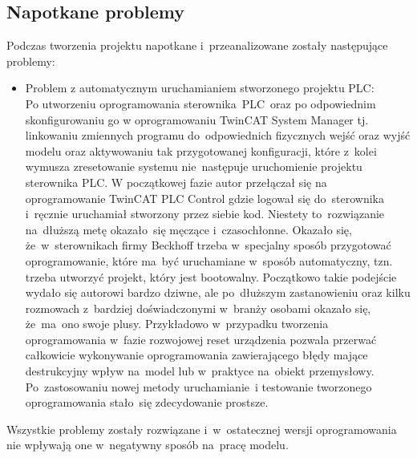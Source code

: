 \subsection{Napotkane problemy}
Podczas tworzenia projektu napotkane i~przeanalizowane zostały następujące problemy:
\begin{itemize}
\item Problem z automatycznym uruchamianiem stworzonego projektu PLC:\\[1mm]
Po utworzeniu oprogramowania sterownika~PLC~oraz po odpowiednim skonfigurowaniu go w oprogramowaniu TwinCAT System Manager tj. linkowaniu zmiennych programu do~odpowiednich fizycznych wejść oraz wyjść modelu oraz aktywowaniu tak przygotowanej konfiguracji, które z~kolei wymusza zresetowanie systemu nie~następuje uruchomienie projektu sterownika PLC. W początkowej fazie autor przełączał się na oprogramowanie TwinCAT PLC Control gdzie logował się do~sterownika i~ręcznie uruchamiał stworzony przez siebie kod. Niestety to~rozwiązanie na~dłuższą metę okazało~się męczące i~czasochłonne. Okazało się, że~w~sterownikach firmy Beckhoff trzeba w~specjalny sposób przygotować oprogramowanie, które ma~być uruchamiane w~sposób automatyczny, tzn. trzeba utworzyć projekt, który jest bootowalny. Początkowo takie podejście wydało się autorowi bardzo dziwne, ale po~dłuższym zastanowieniu oraz kilku rozmowach z~bardziej doświadczonymi w~branży osobami okazało się, że~ma~ono swoje plusy. Przykładowo w~przypadku tworzenia oprogramowania w~fazie rozwojowej reset urządzenia pozwala przerwać całkowicie wykonywanie oprogramowania zawierającego błędy mające destrukcyjny wpływ na~model lub w~praktyce na~obiekt przemysłowy. Po~zastosowaniu nowej metody uruchamianie~i testowanie tworzonego oprogramowania stało~się zdecydowanie prostsze.

\end{itemize}
\indent
\indent Wszystkie problemy zostały rozwiązane i~w~ostatecznej wersji oprogramowania nie wpływają one w~negatywny sposób na~pracę modelu.
